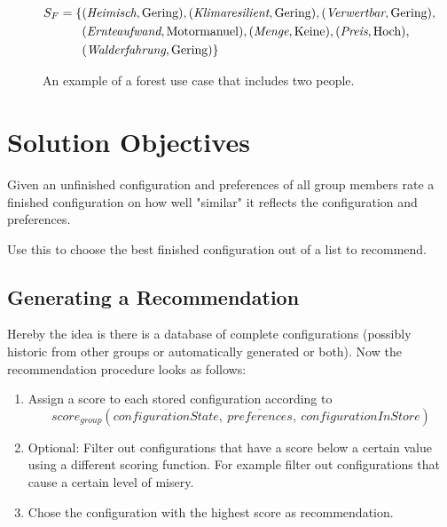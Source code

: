 \begin{figure}
\begin{mdframed}[frametitle={Example for Forest Use Case}]
\begin{align}
            \begin{split}
            S_F  =  \{ & (\textit{Heimisch}, \text{Gering}), (\textit{Klimaresilient}, \text{Gering}), (\textit{Verwertbar}, \text{Gering}), \\
            & (\textit{Ernteaufwand}, \text{Motormanuel}),
            (\textit{Menge}, \text{Keine}), (\textit{Preis}, \text{Hoch}),\\ 
            & (\textit{Walderfahrung}, \text{Gering}) \} 
            \end{split} \notag
        \end{align}
    \end{mdframed}
    \caption{An example of a forest use case that includes two people.}
    \label{fig:Concept:ForestExample}
    \end{figure}


\section{Solution Objectives}
\label{sec:Concept:SolutionObjectives}

Given an unfinished configuration and preferences of all group members rate a finished configuration on how well "similar" it reflects the configuration and preferences.

Use this to choose the best finished configuration out of a list to recommend.

\subsection{Generating a Recommendation}

Hereby the idea is there is a database of complete configurations (possibly historic from other groups or automatically generated or both).
Now the recommendation procedure looks as follows:

\begin{enumerate}
    \item Assign a score to each stored configuration according to $$score_{group}(\overline{configurationState},\ \overline{preferences}, \ configurationInStore)$$
    \item Optional: Filter out configurations that have a score below a certain value using a different scoring function. For example filter out configurations that cause a certain level of misery.
    \item Chose the configuration with the highest score as recommendation.
\end{enumerate}

